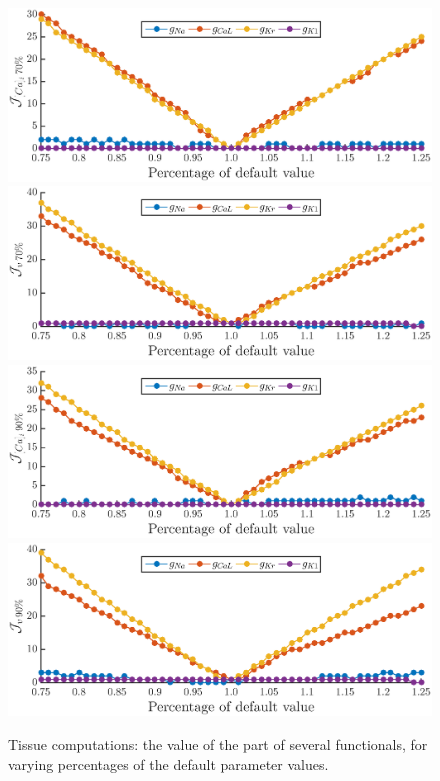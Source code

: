 \documentclass{article}
\begin{document}
%
\begin{figure}
\includegraphics[trim=0cm 0cm 0cm 0.5cm, clip=true, width=1\linewidth]{J_ca70} 
\includegraphics[trim=0cm 0cm 0cm 0.5cm, clip=true, width=1\linewidth]{J_v70} 
\includegraphics[trim=0cm 0cm 0cm 0.5cm, clip=true, width=1\linewidth]{J_ca90} 
\includegraphics[trim=0cm 0cm 0cm 0.5cm, clip=true, width=1\linewidth]{J_v90} 
    \caption{Tissue computations: the value of the part of several functionals, for varying percentages of the default parameter values.}
    \label{fig:9c}
\end{figure}
\end{document}

